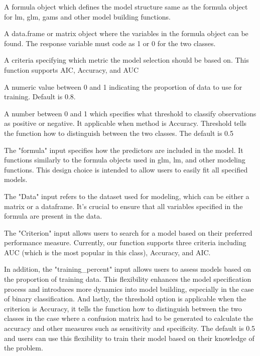 \documentclass[a4paper]{book}
\begin{document}
%
\begin{Arguments}
\begin{ldescription}
\item[\code{formula}] A formula object which defines the model structure same as the formula object
for lm, glm, gams and other model building functions.

\item[\code{data}] A data.frame or matrix object where the variables in the formula object can be found. The response variable must code as 1 or 0 for the two classes.

\item[\code{criterion}]  A criteria specifying which metric the model selection should be based on. This function supports AIC, Accuracy, and AUC

\item[\code{training\_percent}] A numeric value between 0 and 1 indicating the proportion of data to use for training. Default is 0.8.

\item[\code{threshold}]  A number between 0 and 1 which specifies what threshold to classify
observations as positive or negative. It applicable when method is Accuracy.
Threshold tells the function how to distinguish between the two classes.
The default is 0.5 

\end{ldescription}
\end{Arguments}
%
\begin{Details}
The "formula" input specifies how the predictors are included in the model. It functions similarly to the formula objects used in glm, lm, and other modeling functions. This design choice is intended to allow users to easily fit all specified models.


The "Data" input refers to the dataset used for modeling, which can be either a matrix or a dataframe. It's crucial to ensure that all variables specified in the formula are present in the data.

The "Criterion" input allows users to search for a model based on their preferred performance measure. Currently, our function supports three criteria including AUC (which is the most popular in this class), Accuracy, and AIC.

In addition, the "training\_percent" input allows users to assess models based on the proportion of training data. This flexibility enhances the model specification process and introduces more dynamics into model building, especially in the case of binary classification. And lastly, the threshold option is applicable when the criterion is Accuracy, it tells the function how to distinguish between the two classes in the case where a confusion matrix had to be generated  to calculate the accuracy and other measures such as sensitivity and specificity. The default is 0.5 and users can use this flexibility to train their model based on their knowledge of the problem.


\end{Details}
\end{document}

